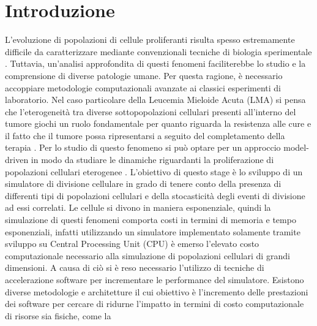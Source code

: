 
\chapter{Introduzione} %

\label{Introduzione} %



L’evoluzione di popolazioni di cellule proliferanti risulta spesso estremamente
difficile da caratterizzare mediante convenzionali tecniche di biologia
sperimentale \cite{bernitz2016stem}. Tuttavia, un’analisi approfondita di questi fenomeni
faciliterebbe lo studio e la comprensione di diverse patologie umane.
Per questa ragione, è necessario accoppiare metodologie computazionali 
avanzate ai classici esperimenti di laboratorio. Nel caso particolare della 
Leucemia Mieloide Acuta (LMA) si pensa che l'eterogeneità tra diverse 
sottopopolazioni cellulari presenti all'interno del tumore giochi un ruolo 
fondamentale per quanto riguarda la resistenza alle cure e il fatto che il 
tumore possa ripresentarsi a seguito del completamento della terapia 
\cite{dohner2015aml}.
Per lo studio di questo fenomeno si può optare per un approccio model-driven 
in modo da studiare le dinamiche riguardanti la proliferazione di 
popolazioni cellulari eterogenee \cite{aml2018unimib}. 
L'obiettivo di questo stage è lo sviluppo di un 
simulatore di divisione cellulare in grado di tenere conto della presenza 
di differenti tipi di popolazioni cellulari e della stocasticità degli eventi
di divisione ad essi correlati. Le cellule si divono in maniera esponenziale, 
quindi la simulazione di questi fenomeni comporta costi in termini di memoria 
e tempo esponenziali, infatti utilizzando un simulatore implementato 
solamente tramite sviluppo su Central Processing Unit (CPU) 
è emerso l'elevato costo 
computazionale necessario alla simulazione di popolazioni cellulari di grandi 
dimensioni. A causa di ciò si è reso necessario 
l'utilizzo di tecniche di accelerazione software per incrementare le 
performance del simulatore. Esistono diverse metodologie e architetture il cui 
obiettivo è l'incremento delle prestazioni dei software per cercare di ridurne
l'impatto in termini di costo computazionale di risorse sia fisiche, come la 
